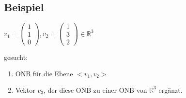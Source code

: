 \subsection{Beispiel}
$v_1=\begin{pmatrix}1 \\ 1 \\ 0\end{pmatrix}, v_2=\begin{pmatrix}1 \\ 3 \\ 2\end{pmatrix} \in \mathbb{R}^3$

gesucht:
\begin{enumerate}
\item
ONB für die Ebene $<v_1,v_2>$
\item
Vektor $v_3$, der diese ONB zu einer ONB von $\mathbb{R}^3$ ergänzt.
\end{enumerate}


